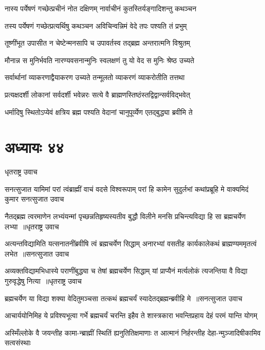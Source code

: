 \twolineshloka
{नास्य पर्येषणं गच्छेत्प्रचीनं नोत दक्षिणम्}
{नार्वाचीनं कुतस्तिर्यङ्गादिशन्तु कथञ्चन}


\twolineshloka
{तस्य पर्येषणं गच्छेत्प्रत्यर्थिषु कथञ्चन}
{अविचिन्वन्निमं वेदे तपः पश्यति तं प्रभुम्}


\twolineshloka
{तूष्णींभूत उपासीत न चेष्टेन्मनसापि च}
{उपावर्तस्व तद्ब्रह्म अन्तरात्मनि विश्रुतम्}


\twolineshloka
{मौनान्न स मुनिर्भवति नारण्यवसनान्मुनिः}
{स्वलक्षणं तु यो वेद स मुनिः श्रेष्ठ उच्यते}


\twolineshloka
{सर्वार्थानां व्याकरणाद्वैयाकरण उच्यते}
{तन्मूलतो व्याकरणं व्याकरोतीति तत्तथा}


\twolineshloka
{प्रत्यक्षदर्शी लोकानां सर्वदर्शी भवेन्नरः}
{सत्ये वै ब्राह्मणस्तिष्ठंस्तद्विद्वान्सर्वविद्भवेत्}


\twolineshloka
{धर्मादिषु स्थितोऽप्येवं क्षत्रिय ब्रह्म पश्यति}
{वेदानां चानुपूर्व्येण एतद्बुद्ध्या ब्रवीमि ते}


\chapter{अध्यायः ४४}
\twolineshloka
{धृतराष्ट्र उवाच}
{}


\fourlineindentedshloka
{सनत्सुजात यामिमां परां त्वंब्राह्मीं वाचं वदसे विश्वरूपाम्}
{परां हि कामेन सुदुर्लभां कथांप्रब्रूहि मे वाक्यमिदं कुमार}
{सनत्सुजात उवाच}
{}


\threelineshloka
{नैतद्ब्रह्म त्वरमाणेन लभ्यंयन्मां पृच्छन्नतिहृष्यस्यतीव}
{बुद्धौ विलीने मनसि प्रचिन्त्यविद्या हि सा ब्रह्मचर्येण लभ्या ॥धृतराष्ट्र उवाच}
{}


\threelineshloka
{अत्यन्तविद्यामिति यत्सनातनींब्रवीषि त्वं ब्रह्मचर्येण सिद्धाम्}
{अनारभ्यां वसतीह कार्यकालेकथं ब्राह्मण्यममृतत्वं लभेत ॥सनत्सुजात उवाच}
{}


\threelineshloka
{अव्यक्तविद्यामभिधास्ये पराणींबुद्ध्या च तेषां ब्रह्मचर्येण सिद्धाम्}
{यां प्राप्यैनं मर्त्यलोकं त्यजन्तिया वै विद्या गुरुवृद्धेषु नित्या ॥धृतराष्ट्र उवाच}
{}


\threelineshloka
{ब्रह्मचर्येण या विद्या शक्या वेदितुमञ्चसा}
{तत्कथं ब्रह्मचर्यं स्यादेतद्ब्रह्मन्ब्रवीहि मे ॥सनत्सुजात उवाच}
{}


\twolineshloka
{आचार्ययोनिमिह ये प्रविश्यभूत्वा गर्भे ब्रह्मचर्यं चरन्ति}
{इहैव ते शास्त्रकारा भवन्तिप्रहाय देहं परमं यान्ति योगम्}


\twolineshloka
{अस्मिँल्लोके वै जयन्तीह कामा-न्ब्राह्मीं स्थितिं ह्यनुतितिक्षमाणाः}
{त आत्मानं निर्हरन्तीह देहा-न्मुञ्जादिषीकामिव सत्वसंस्थाः}


